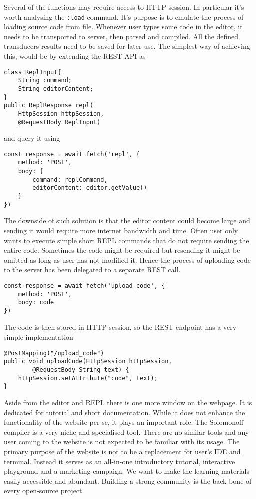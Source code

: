 Several of the functions may require access to HTTP session. In particular it's worth analysing the \texttt{:load} command. It's purpose is to emulate the process of loading source code from file. Whenever user types some code in the editor, it needs to be transported to server, then parsed and compiled. All the defined transducers results need to be saved for later use. The simplest way of achieving this, would be by extending the REST API as
\begin{lstlisting}
class ReplInput{
	String command;
	String editorContent;
}
public ReplResponse repl(
    HttpSession httpSession, 
    @RequestBody ReplInput)
\end{lstlisting}
and query it using
\begin{lstlisting}
const response = await fetch('repl', {
    method: 'POST',
    body: {
        command: replCommand,
        editorContent: editor.getValue()
    }
})
\end{lstlisting}
The downside of such solution is that the editor content could become large and sending it would require more internet bandwidth and time. Often user only wants to execute simple short REPL commands that do not require sending the entire code. Sometimes the code might be required but resending it might be omitted as long as user has not modified it. Hence the process of uploading code to the server has been delegated to a separate REST call.
\begin{lstlisting}
const response = await fetch('upload_code', {
	method: 'POST',
	body: code
})
\end{lstlisting}
The code is then stored in HTTP session, so the REST endpoint has a very simple implementation
\begin{lstlisting}
@PostMapping("/upload_code")
public void uploadCode(HttpSession httpSession, 
        @RequestBody String text) {
    httpSession.setAttribute("code", text);
}
\end{lstlisting}


Aside from the editor and REPL there is one more window on the webpage. It is dedicated for tutorial and short documentation.  While it does not enhance the functionality of the website per se, it plays an important role. The Solomonoff compiler is a very niche and specialised tool. There are no similar tools and any user coming to the website is not expected to be familiar with its usage. The primary purpose of the website is not to be a replacement for user's IDE and terminal. Instead it serves as an all-in-one introductory tutorial, interactive playground and a marketing campaign. We want to make the learning materials easily accessible and abundant. Building a strong community is the back-bone of every open-source project. 












